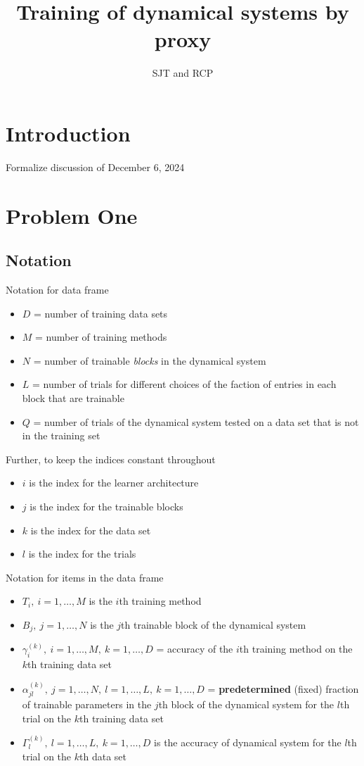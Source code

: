 \documentclass{article}
\title{Training of dynamical systems by proxy}
\author{SJT and RCP}
\begin{document}
\maketitle

\section{Introduction}

Formalize discussion of December 6, 2024

\section{Problem One}
\subsection{Notation}

Notation for data frame
\begin{itemize}
    \item $D$ = number of training data sets
    \item $M$ = number of training methods
    \item $N$ = number of trainable \emph{blocks} in the dynamical system
    \item $L$ = number of trials for different choices of the faction of entries in each block that are trainable
    \item $Q$ = number of trials of the dynamical system tested on a data set that is not in the training set
    
\end{itemize}
Further, to keep the indices constant throughout
\begin{itemize}
    \item $i$ is the index for the learner architecture
    \item $j$ is the index for the trainable blocks
    \item $k$ is the index for the data set
    \item $l$ is the index for the trials
\end{itemize}

Notation for items in the data frame 
\begin{itemize}
    \item $T_i,\ i=1,\dots,M$ is the $i$th training method
    \item $B_j,\ j=1,\dots,N$ is the $j$th trainable block of the dynamical system
    \item $\gamma_i^{(k)},\ i=1,\dots,M, \ k=1,\dots,D$ = accuracy of the $i$th training method on the $k$th training data set
    \item $\alpha_{jl}^{(k)},\ j=1,\dots,N, \ l=1,\dots,L, \ k=1,\dots,D$ = \textbf{predetermined} (fixed) fraction of trainable parameters in the $j$th block of the dynamical system for the $l$th trial on the $k$th training data set
    \item $\Gamma_l^{(k)},\ l=1,\dots,L, \ k=1,\dots,D$ is the accuracy of dynamical system for the $l$th trial on the $k$th data set
\end{itemize}
\end{document}
